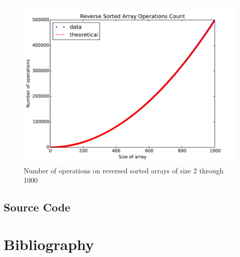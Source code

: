 \documentclass{article}
\begin{document}
        \begin{figure}[h]
            \includegraphics[width=\textwidth, height=0.4\textheight]{reverse_sorted_array_basic_operation_count}
            \caption{Number of operations on reversed sorted arrays of size 2 through 1000}
        \end{figure}
    \FloatBarrier
    \subsection{Source Code}
\section{Bibliography}
    
\end{document}
